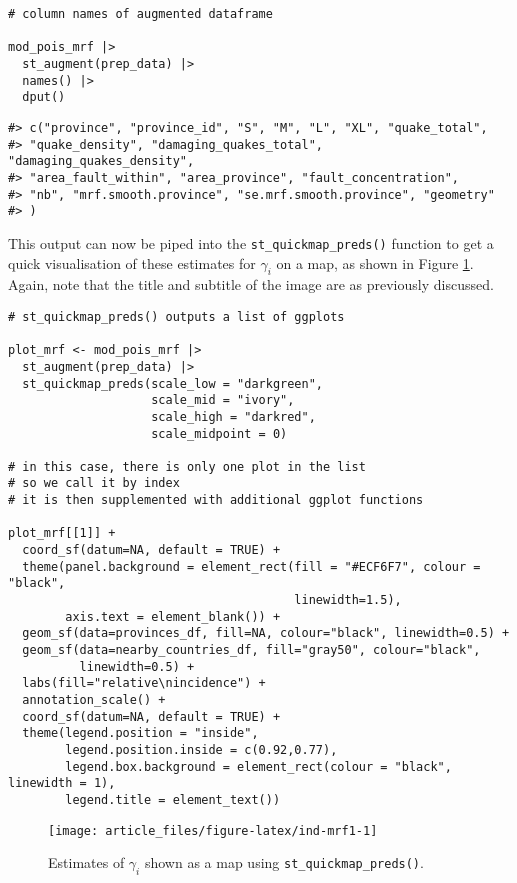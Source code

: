 \begin{verbatim}
# column names of augmented dataframe

mod_pois_mrf |>
  st_augment(prep_data) |>
  names() |>
  dput()
\end{verbatim}

\begin{verbatim}
#> c("province", "province_id", "S", "M", "L", "XL", "quake_total", 
#> "quake_density", "damaging_quakes_total", "damaging_quakes_density", 
#> "area_fault_within", "area_province", "fault_concentration", 
#> "nb", "mrf.smooth.province", "se.mrf.smooth.province", "geometry"
#> )
\end{verbatim}

This output can now be piped into the \texttt{st\_quickmap\_preds()} function to get a quick visualisation of
these estimates for \(\gamma_i\) on a map, as shown in Figure \ref{fig:ind-mrf1}. Again, note that the title and subtitle of the image are as previously discussed.



\begin{verbatim}
# st_quickmap_preds() outputs a list of ggplots

plot_mrf <- mod_pois_mrf |>
  st_augment(prep_data) |>
  st_quickmap_preds(scale_low = "darkgreen",
                    scale_mid = "ivory",
                    scale_high = "darkred",
                    scale_midpoint = 0)

# in this case, there is only one plot in the list
# so we call it by index
# it is then supplemented with additional ggplot functions

plot_mrf[[1]] +
  coord_sf(datum=NA, default = TRUE) +
  theme(panel.background = element_rect(fill = "#ECF6F7", colour = "black",
                                        linewidth=1.5),
        axis.text = element_blank()) +
  geom_sf(data=provinces_df, fill=NA, colour="black", linewidth=0.5) +
  geom_sf(data=nearby_countries_df, fill="gray50", colour="black",
          linewidth=0.5) +
  labs(fill="relative\nincidence") +
  annotation_scale() +
  coord_sf(datum=NA, default = TRUE) +
  theme(legend.position = "inside",
        legend.position.inside = c(0.92,0.77),
        legend.box.background = element_rect(colour = "black", linewidth = 1),
        legend.title = element_text())
\end{verbatim}

\begin{figure}

{\centering \texttt{[image: article\_files/figure-latex/ind-mrf1-1]} 

}

\caption{Estimates of \(\gamma_i\) shown as a map using \texttt{st\_quickmap\_preds()}.}\label{fig:ind-mrf1}
\end{figure}

